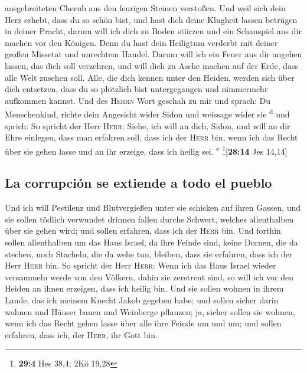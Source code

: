 ausgebreiteten Cherub aus den feurigen Steinen verstoßen.
 Und weil sich dein Herz erhebt, dass du so schön bist,
und hast dich deine Klugheit lassen betrügen in deiner Pracht, darum
will ich dich zu Boden stürzen und ein Schauspiel aus dir machen vor den
Königen.  Denn du hast dein Heiligtum verderbt mit deiner
großen Missetat und unrechtem Handel. Darum will ich ein Feuer aus dir
angehen lassen, das dich soll verzehren, und will dich zu Asche machen
auf der Erde, dass alle Welt zusehen soll.  Alle, die
dich kennen unter den Heiden, werden sich über dich entsetzen, dass du
so plötzlich bist untergegangen und nimmermehr aufkommen kannst.
 Und des \textsc{Herrn} Wort geschah zu mir und sprach:
 Du Menschenkind, richte dein Angesicht wider Sidon und
weissage wider sie \textsuperscript{d}  und sprich: So
spricht der Herr \textsc{Herr}: Siehe, ich will an dich, Sidon, und will
an dir Ehre einlegen, dass man erfahren soll, dass ich der \textsc{Herr}
bin, wenn ich das Recht über sie gehen lasse und an ihr erzeige, dass
ich heilig sei. \textsuperscript{e} \footnote{\textbf{29:4} Hes 38,4;
  2Kö 19,28}{[}\textbf{28:14} Jes 14,14{]}

\hypertarget{la-corrupciuxf3n-se-extiende-a-todo-el-pueblo}{%
\subsection{La corrupción se extiende a todo el
pueblo}\label{la-corrupciuxf3n-se-extiende-a-todo-el-pueblo}}

 Und ich will Pestilenz und Blutvergießen unter sie
schicken auf ihren Gassen, und sie sollen tödlich verwundet drinnen
fallen durchs Schwert, welches allenthalben über sie gehen wird; und
sollen erfahren, dass ich der \textsc{Herr} bin.  Und
forthin sollen allenthalben um das Haus Israel, da ihre Feinde sind,
keine Dornen, die da stechen, noch Stacheln, die da wehe tun, bleiben,
dass sie erfahren, dass ich der Herr \textsc{Herr} bin. 
So spricht der Herr \textsc{Herr}: Wenn ich das Haus Israel wieder
versammeln werde von den Völkern, dahin sie zerstreut sind, so will ich
vor den Heiden an ihnen erzeigen, dass ich heilig bin. Und sie sollen
wohnen in ihrem Lande, das ich meinem Knecht Jakob gegeben habe;
 und sollen sicher darin wohnen und Häuser bauen und
Weinberge pflanzen; ja, sicher sollen sie wohnen, wenn ich das Recht
gehen lasse über alle ihre Feinde um und um; und sollen erfahren, dass
ich, der \textsc{Herr}, ihr Gott bin.

